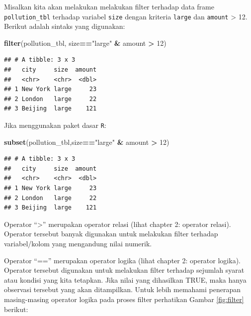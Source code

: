 \documentclass[]{book}
\newenvironment{Shaded}{\begin{snugshade}}{\end{snugshade}}
\newcommand{\KeywordTok}[1]{\textcolor[rgb]{0.13,0.29,0.53}{\textbf{#1}}}
\newcommand{\DecValTok}[1]{\textcolor[rgb]{0.00,0.00,0.81}{#1}}
\newcommand{\StringTok}[1]{\textcolor[rgb]{0.31,0.60,0.02}{#1}}
\newcommand{\OperatorTok}[1]{\textcolor[rgb]{0.81,0.36,0.00}{\textbf{#1}}}
\newcommand{\NormalTok}[1]{#1}
\begin{document}
Misalkan kita akan melakukan melakukan filter terhadap data frame
\texttt{pollution\_tbl} terhadap variabel \texttt{size} dengan kriteria
\texttt{large} dan \texttt{amount} \textgreater{} 12. Berikut adalah
sintaks yang digunakan:

\begin{Shaded}
\begin{Highlighting}[]
\KeywordTok{filter}\NormalTok{(pollution_tbl, size}\OperatorTok{==}\StringTok{"large"} \OperatorTok{&}\StringTok{ }\NormalTok{amount }\OperatorTok{>}\StringTok{ }\DecValTok{12}\NormalTok{)}
\end{Highlighting}
\end{Shaded}

\begin{verbatim}
## # A tibble: 3 x 3
##   city     size  amount
##   <chr>    <chr>  <dbl>
## 1 New York large     23
## 2 London   large     22
## 3 Beijing  large    121
\end{verbatim}

Jika menggunakan paket dasar \texttt{R}:

\begin{Shaded}
\begin{Highlighting}[]
\KeywordTok{subset}\NormalTok{(pollution_tbl,size}\OperatorTok{==}\StringTok{"large"} \OperatorTok{&}\StringTok{ }\NormalTok{amount }\OperatorTok{>}\StringTok{ }\DecValTok{12}\NormalTok{)}
\end{Highlighting}
\end{Shaded}

\begin{verbatim}
## # A tibble: 3 x 3
##   city     size  amount
##   <chr>    <chr>  <dbl>
## 1 New York large     23
## 2 London   large     22
## 3 Beijing  large    121
\end{verbatim}

Operator ``\textgreater{}'' merupakan operator relasi (lihat chapter 2:
operator relasi). Operator tersebut banyak digunakan untuk melakukan
filter terhadap variabel/kolom yang mengandung nilai numerik.

Operator ``=='' merupakan operator logika (lihat chapter 2: operator
logika). Operator tersebut digunakan untuk melakukan filter terhadap
sejumlah syarat atau kondisi yang kita tetapkan. Jika nilai yang
dihasilkan TRUE, maka hanya observasi tersebut yang akan ditampilkan.
Untuk lebih memahami penerapan masing-masing operator logika pada proses
filter perhatikan Gambar \ref{fig:filter} berikut:
\end{document}
